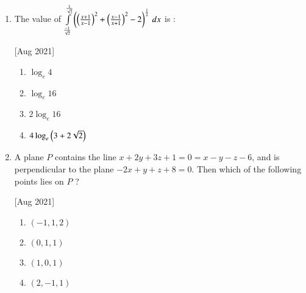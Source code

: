 \documentclass[journal,12pt,twocolumn]{IEEEtran}
\theoremstyle{remark}
\begin{document}
\begin{enumerate}
    \item The value of $\int\limits_{\frac{-1}{\sqrt{2}}}^{\frac{1}{\sqrt{2}}}\left(\left(\frac{x+1}{x-1}\right)^2+\left(\frac{x-1}{x+1}\right)^2-2\right)^{\frac{1}{2}}\,dx$ is :
    
    \hfill[Aug 2021]
        \begin{enumerate}
            \item $\log_e4$
            \item $\log_e16$
            \item $2\log_e16$
            \item $4\log_e\left(3+2\sqrt{2}\right)$
        \end{enumerate}

    \item A plane $P$ contains the line $x+2y+3z+1=0=x-y-z-6$, and is perpendicular to the plane $-2x+y+z+8=0$. Then which of the following points lies on $P$ ?
    
    \hfill[Aug 2021]
        \begin{enumerate}
            \item $(-1, 1, 2)$
            \item $(0, 1, 1)$
            \item $(1, 0, 1)$
            \item $(2, -1, 1)$
        \end{enumerate}

\end{enumerate}
\end{document}
